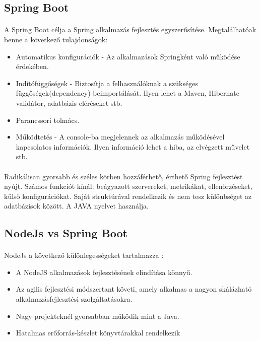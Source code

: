 	\subsection{Spring Boot}
	\paragraph{}
	A Spring Boot célja a Spring alkalmazás fejlesztés egyszerűsítése. Megtalálhatóak benne a következő tulajdonságok:
	\begin{itemize}
		\item Automatikus konfigurációk - Az alkalmazások Springként való működése érdekében.
		\item Indítófüggőségek - Biztosítja a felhasználóknak a szükséges függőségek(dependency) beimportálását. Ilyen lehet a Maven, Hibernate validátor, adatbázis eléréseket stb.
		\item Parancssori tolmács.
		\item Működtetés - A console-ba megjelennek az alkalmazás működésével kapcsolatos információk. Ilyen információ lehet a hiba, az elvégzett művelet stb.
	\end{itemize}
	
	\paragraph{}
	Radikálisan gyorsabb és széles körben hozzáférhető, érthető Spring fejlesztést nyújt. Számos funkciót kínál: beágyazott szervereket, metrikákat, ellenőrzéseket, külső konfigurációkat. Saját struktúrával rendelkezik és nem tesz különbséget az adatbázisok között. A JAVA nyelvet használja.\cite{jovanovic2017java}
	
	\subsection{NodeJs vs Spring Boot}
	\paragraph{}
	NodeJs a következő különlegességeket tartalmazza \cite{nodejsspring}:
	\begin{itemize}
		\item A NodeJS alkalmazások fejlesztésének elindítása könnyű.
		\item Az agilis fejlesztési módszertant követi, amely alkalmas a nagyon skálázható alkalmazásfejlesztési szolgáltatásokra.
		\item Nagy projekteknél gyorsabban működik mint a Java.
		\item Hatalmas erőforrás-készlet könyvtárakkal rendelkezik
	\end{itemize}
	
